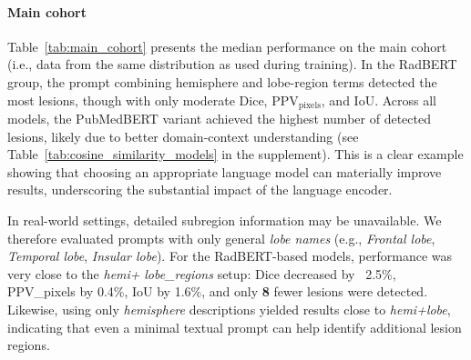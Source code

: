 \documentclass[a4paper,12pt]{article}
\begin{document}
\paragraph{Main cohort}

Table~\ref{tab:main_cohort} presents the median performance on the main cohort (i.e., data from the same distribution as used during training).
In the RadBERT group, the prompt combining hemisphere and lobe-region terms detected the most lesions, though with only moderate Dice, PPV$_\text{pixels}$, and IoU. Across all models, the PubMedBERT variant achieved the highest number of detected lesions, likely due to better domain-context understanding (see Table~\ref{tab:cosine_similarity_models} in the supplement). This is a clear example showing that choosing an appropriate language model can materially improve results, underscoring the substantial impact of the language encoder.

In real-world settings, detailed subregion information may be unavailable. We therefore evaluated prompts with only general \textit{lobe names} (e.g., \textit{Frontal lobe}, \textit{Temporal lobe}, \textit{Insular lobe}). For the RadBERT-based models, performance was very close to the \textit{hemi+} \textit{lobe\_regions} setup: Dice decreased by ~2.5\%, PPV\_{pixels} by 0.4\%, IoU by 1.6\%, and only \textbf{8} fewer lesions were detected. Likewise, using only \textit{hemisphere} descriptions yielded results close to \textit{hemi+lobe}, indicating that even a minimal textual prompt can help identify additional lesion regions.
\end{document}
